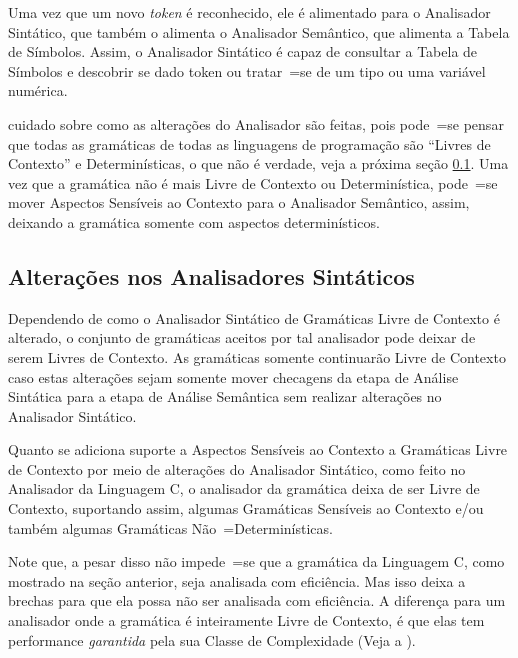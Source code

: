 {    Uma vez que um novo \textit{token} é reconhecido,
    ele é alimentado para o Analisador Sintático,
    que também o alimenta o Analisador Semântico,
    que alimenta a Tabela de Símbolos.
    Assim,
    o Analisador Sintático é capaz de consultar a Tabela de Símbolos \cite{ahoCompilerDragonBook} e
    descobrir se dado token ou
    tratar~=se de um tipo ou
    uma variável numérica.

     cuidado sobre como as alterações do Analisador são feitas,
    pois pode~=se pensar que todas as gramáticas de todas as linguagens de programação são ``Livres de Contexto'' e
    Determinísticas,
    o que não é verdade,
    veja a próxima seção \ref{alteracoesNosAnalisadoresSintaticos}.
    Uma vez que a gramática não é mais Livre de Contexto ou
    Determinística,
    pode~=se mover Aspectos Sensíveis ao Contexto para o Analisador Semântico,
    assim,
    deixando a gramática somente com aspectos determinísticos.


\subsection{Alterações nos Analisadores Sintáticos}
\label{alteracoesNosAnalisadoresSintaticos}

    Dependendo de como o Analisador Sintático de Gramáticas Livre de Contexto é alterado,
    o conjunto de gramáticas aceitos por tal analisador pode deixar de serem Livres de Contexto.
    As gramáticas somente continuarão Livre de Contexto caso estas alterações sejam somente mover checagens da etapa de Análise Sintática para a etapa de Análise Semântica sem realizar alterações no Analisador Sintático.

    Quanto se adiciona suporte a Aspectos Sensíveis ao Contexto \cite{contextSensitiveParsing} a Gramáticas Livre de Contexto por meio de alterações do Analisador Sintático,
    como feito no Analisador da Linguagem C,
    o analisador da gramática deixa de ser Livre de Contexto,
    suportando assim,
    algumas Gramáticas Sensíveis ao Contexto e\slash{}ou também algumas Gramáticas Não~=Determinísticas.

    Note que,
    a pesar disso não impede~=se que a gramática da Linguagem C,
    como mostrado na seção anterior,
    seja analisada com eficiência.
    Mas isso deixa a brechas para que ela possa não ser analisada com eficiência.
    A diferença para um analisador onde a gramática é inteiramente Livre de Contexto,
    é que elas tem performance \textit{garantida} pela sua Classe de Complexidade (Veja a ).

}
